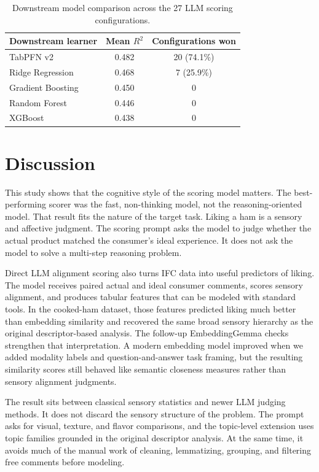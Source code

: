 \documentclass[12pt]{article}
\newcommand{\Rtwo}{\ensuremath{R^2}}
\begin{document}
\begin{table}[ht]
\centering
\caption{Downstream model comparison across the 27 LLM scoring configurations.}
\label{tab:downstream}
\begin{tabular}{lcc}
\toprule
Downstream learner & Mean \Rtwo{} & Configurations won \\
\midrule
TabPFN v2 & 0.482 & 20 (74.1\%) \\
Ridge Regression & 0.468 & 7 (25.9\%) \\
Gradient Boosting & 0.450 & 0 \\
Random Forest & 0.446 & 0 \\
XGBoost & 0.438 & 0 \\
\bottomrule
\end{tabular}
\end{table}

\section{Discussion}

This study shows that the cognitive style of the scoring model matters. The best-performing scorer was the fast, non-thinking model, not the reasoning-oriented model. That result fits the nature of the target task. Liking a ham is a sensory and affective judgment. The scoring prompt asks the model to judge whether the actual product matched the consumer's ideal experience. It does not ask the model to solve a multi-step reasoning problem.

Direct LLM alignment scoring also turns IFC data into useful predictors of liking. The model receives paired actual and ideal consumer comments, scores sensory alignment, and produces tabular features that can be modeled with standard tools. In the cooked-ham dataset, those features predicted liking much better than embedding similarity and recovered the same broad sensory hierarchy as the original descriptor-based analysis. The follow-up EmbeddingGemma checks strengthen that interpretation. A modern embedding model improved when we added modality labels and question-and-answer task framing, but the resulting similarity scores still behaved like semantic closeness measures rather than sensory alignment judgments.

The result sits between classical sensory statistics and newer LLM judging methods. It does not discard the sensory structure of the problem. The prompt asks for visual, texture, and flavor comparisons, and the topic-level extension uses topic families grounded in the original descriptor analysis. At the same time, it avoids much of the manual work of cleaning, lemmatizing, grouping, and filtering free comments before modeling.
\end{document}
